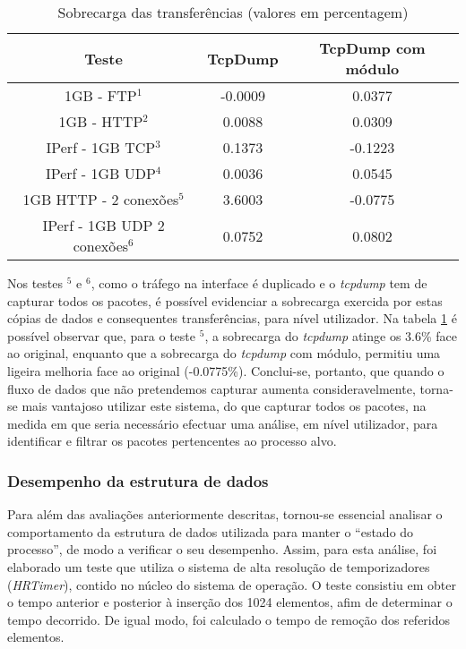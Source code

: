 \begin{table}
\begin{center}
\caption{Sobrecarga das transferências (valores em percentagem)}
\begin{tabular}{ | c | c | c |}
\hline
Teste & \hspace {0.3cm} TcpDump \hspace {0.3cm} & TcpDump com módulo  \\

\hline
1GB - FTP$^{1}$ & -0.0009  & 0.0377  \\
1GB - HTTP$^{2}$ & 0.0088 &  0.0309   \\
IPerf - 1GB TCP$^{3}$ & 0.1373 &  -0.1223   \\
IPerf - 1GB UDP$^{4}$ & 0.0036 & 0.0545 \\
\hline
\hline
1GB HTTP - 2 conexões$^{5}$ & 3.6003 & -0.0775   \\
IPerf - 1GB UDP 2 conexões$^{6}$ & 0.0752 & 0.0802   \\
\hline
\end{tabular}
\label{tab:overhead}
\end{center}
\end{table}

Nos testes $^{5}$ e $^{6}$, como o tráfego na interface é duplicado e o \textit{tcpdump} tem de capturar todos os pacotes, é possível evidenciar a sobrecarga exercida por estas cópias de dados e consequentes transferências, para nível utilizador.
 Na tabela \ref{tab:overhead} é possível observar que, para o teste $^{5}$, a sobrecarga do \textit{tcpdump} atinge os 3.6\% face ao original, enquanto que a sobrecarga do \textit{tcpdump} com módulo, permitiu uma ligeira melhoria face ao original (-0.0775\%).
 Conclui-se, portanto, que quando o fluxo de dados que não pretendemos capturar aumenta consideravelmente, torna-se mais vantajoso utilizar este sistema, do que capturar todos os pacotes, na medida em que seria necessário efectuar uma análise, em nível utilizador, para identificar e filtrar os pacotes pertencentes ao processo alvo.

\subsubsection{Desempenho da estrutura de dados}

Para além das avaliações anteriormente descritas, tornou-se essencial analisar o comportamento da estrutura de dados utilizada para manter o “estado do processo”, de modo a verificar o seu desempenho. 
 Assim, para esta análise, foi elaborado um teste que utiliza o sistema de alta resolução de temporizadores (\textit{HRTimer}), contido no núcleo do sistema de operação.
 O teste consistiu em obter o tempo anterior e posterior à inserção dos 1024 elementos, afim de determinar o tempo decorrido.
 De igual modo, foi calculado o tempo de remoção dos referidos elementos.

